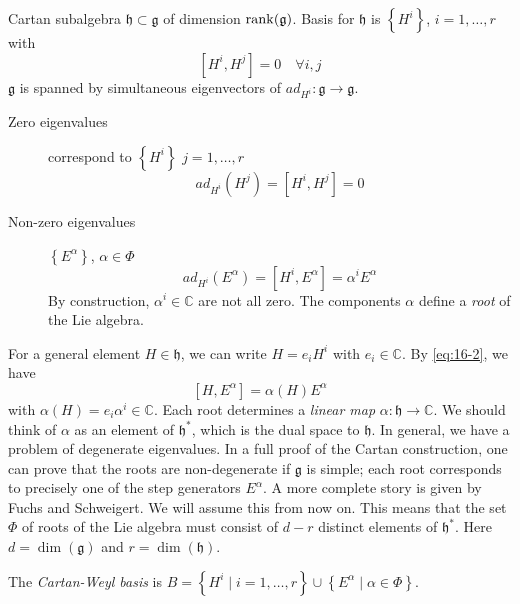 Cartan subalgebra $\mathfrak{h} \subset \mathfrak{g}$ of dimension $\rank(\mathfrak{g})$.
Basis for $\mathfrak{h}$ is $\left\{ H^{i} \right\}$, $i = 1, \dots, r$ with
\begin{equation}
  \label{eq:16-1}
  [H^{i}, H^{j}] = 0 \quad \forall i, j
\end{equation}
$\mathfrak{g}$ is spanned by simultaneous eigenvectors of $ad_{H^{i}} \colon \mathfrak{g} \to \mathfrak{g}$.
\begin{description}
  \item[Zero eigenvalues] correspond to $\left\{ H^{i} \right\}$ $j = 1, \dots, r$
    \begin{equation}
      ad_{H^{i}}(H^{j}) = [H^{i}, H^{j}] = 0
    \end{equation}
  \item[Non-zero eigenvalues] $\left\{ E^{\alpha} \right\}$, $\alpha \in \Phi$
    \begin{equation}
      \label{eq:16-2}
      ad_{H^{i}}(E^{\alpha}) = [H^{i}, E^{\alpha}] = \alpha^{i} E^{\alpha}
    \end{equation}
    By construction, $\alpha^{i} \in \mathbb{C}$ are not all zero. The components $\alpha$ define a \emph{root} of the Lie algebra.
\end{description}
For a general element $H \in \mathfrak{h}$, we can write $H = e_{i} H^{i}$ with $e_{i} \in \mathbb{C}$.
By \eqref{eq:16-2}, we have
\begin{equation}
  \label{eq:16-3}
  [H, E^{\alpha}] = \alpha(H) E^{\alpha}
\end{equation}
with $\alpha(H) = e_{i} \alpha^{i} \in \mathbb{C}$.
Each root determines a \emph{linear map} $\alpha \colon \mathfrak{h} \to \mathbb{C}$. We should think of $\alpha$ as an element of $\mathfrak{h}^*$, which is the dual space to $\mathfrak{h}$.
In general, we have a problem of degenerate eigenvalues.
In a full proof of the Cartan construction, one can prove that the roots are non-degenerate if $\mathfrak{g}$ is simple; each root corresponds to precisely one of the step generators $E^{\alpha}$.
A more complete story is given by Fuchs and Schweigert.
We will assume this from now on.
This means that the set $\Phi$ of roots of the Lie algebra must consist of $d-r$ distinct elements of $\mathfrak{h}^*$. Here $d = \dim(\mathfrak{g})$ and $r = \dim(\mathfrak{h})$.
\begin{definition}[]
  The \emph{Cartan-Weyl basis} is $B = \left\{ H^{i} \mid i=1, \dots, r \right\} \cup \left\{ E^{\alpha} \mid \alpha \in \Phi \right\}$.
\end{definition}

